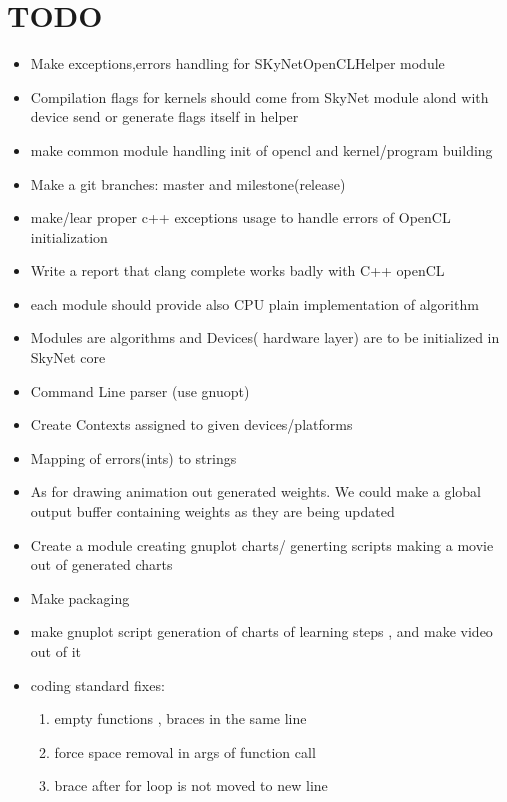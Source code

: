 \documentclass[a4paper,10pt]{article}
\begin{document}
\section{TODO}
\begin{itemize}
\item Make exceptions,errors handling for SKyNetOpenCLHelper module
\item Compilation flags for kernels should come from SkyNet module alond with device send or generate flags itself in helper
\item make common module handling init of opencl and kernel/program building
\item Make a git branches: master and milestone(release)
\item make/lear proper c++ exceptions usage to handle errors of OpenCL initialization
\item Write a report that clang complete works badly with C++ openCL
\item each module should provide also CPU plain implementation of algorithm
\item Modules are algorithms and Devices( hardware layer) are to be initialized in SkyNet core
\item Command Line parser (use gnuopt)
\item Create Contexts assigned to given devices/platforms
\item Mapping of errors(ints) to strings
\item As for drawing animation out generated weights. We could make a global output buffer
containing weights as they are being updated
\item Create a module creating gnuplot charts/ generting scripts making a movie out of generated charts
\item Make packaging
\item make gnuplot script generation of charts of learning steps , and make video out of it
\item coding standard fixes:
\begin{enumerate}
\item empty functions , braces in the same line
\item force space removal in args of function call
\item brace after for loop is not moved to new line
\end{enumerate}
\end{itemize}
\end{document}
